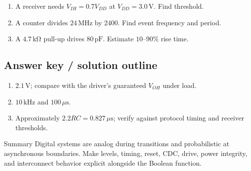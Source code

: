 \documentclass[10pt,letterpaper]{article}
\begin{document}
\begin{enumerate}
  \item A receiver needs $V_{IH}=0.7V_{DD}$ at $V_{DD}=3.0\,\mathrm{V}$. Find threshold.
  \item A counter divides $24\,\mathrm{MHz}$ by 2400. Find event frequency and period.
  \item A $4.7\,\mathrm{k\Omega}$ pull-up drives $80\,\mathrm{pF}$. Estimate $10$--$90\%$ rise time.
\end{enumerate}\subsection{Answer key / solution outline}
\begin{enumerate}
  \item $2.1\,\mathrm{V}$; compare with the driver's guaranteed $V_{OH}$ under load.
  \item $10\,\mathrm{kHz}$ and $100\,\mu\mathrm{s}$.
  \item Approximately $2.2RC=0.827\,\mu\mathrm{s}$; verify against protocol timing and receiver thresholds.
\end{enumerate}\begin{CornellSummaryBox}{Summary}
Digital systems are analog during transitions and probabilistic at asynchronous boundaries. Make levels, timing, reset, CDC, drive, power integrity, and interconnect behavior explicit alongside the Boolean function.
\end{CornellSummaryBox}
\end{document}
